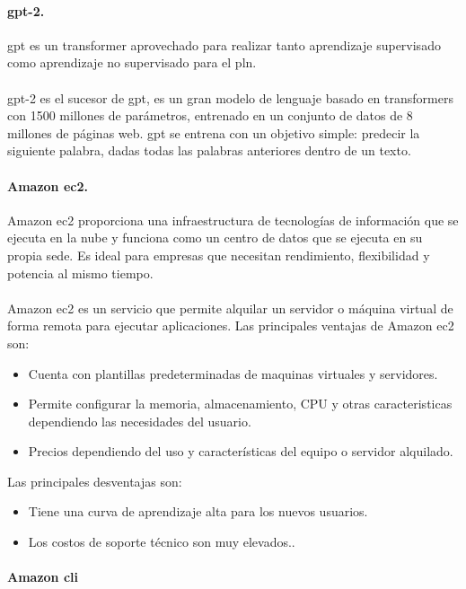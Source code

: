 \documentclass[12pt, a4paper, titlepage]{report}
\begin{document}
			\paragraph{\acrshort{gpt}-2. \\}
			\acrfull{gpt} es un transformer aprovechado para realizar tanto aprendizaje supervisado como aprendizaje no supervisado para el \acrfull{pln}.\\\\        
			\acrshort{gpt}-2 es el sucesor de \acrshort{gpt}, es un gran modelo de lenguaje basado en transformers con 1500 millones de parámetros, entrenado en un conjunto de datos de 8 millones de páginas web. \acrshort{gpt} se entrena con un objetivo simple: predecir la siguiente palabra, dadas todas las palabras anteriores dentro de un texto. \cite{refQueesgpt}
			\paragraph{Amazon \acrshort{ec2}. \\}
			Amazon \acrfull{ec2} proporciona una infraestructura de tecnologías de información que se ejecuta en la nube y funciona como un centro de datos que se ejecuta en su propia sede. Es ideal para empresas que necesitan rendimiento, flexibilidad y potencia al mismo tiempo.\\\\
			Amazon \acrshort{ec2} es un servicio que permite alquilar un servidor o máquina virtual de forma remota para ejecutar aplicaciones.	
			Las principales ventajas de Amazon \acrshort{ec2} son: 
			\begin{itemize}
				\item Cuenta con plantillas predeterminadas de maquinas virtuales y servidores.
				\item Permite configurar la memoria, almacenamiento, CPU y otras caracteristicas dependiendo las necesidades del usuario.
				\item Precios dependiendo del uso y características del equipo o servidor alquilado.
			\end{itemize}
			
			Las principales desventajas son: 
			\begin{itemize}
				\item Tiene una curva de aprendizaje alta para los nuevos usuarios.
				\item Los costos de soporte técnico son muy elevados..
			\end{itemize}		
			\paragraph{Amazon \acrshort{cli} \\}
			
\end{document}
